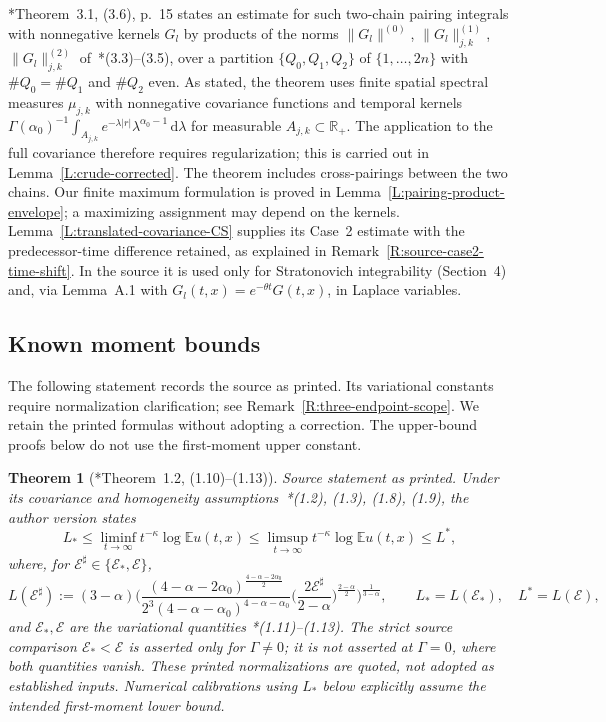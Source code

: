 \documentclass[12pt,oneside,openany]{book}
\numberwithin{equation}{section}
\newtheorem{theorem}{Theorem}[section]
\theoremstyle{nogostyle}
\theoremstyle{definition}
\newcommand{\R}{\mathbb{R}}
\newcommand{\E}{\mathbb{E}}
\newcommand{\ud}{\,\mathrm{d}}
\newcommand{\cE}{\mathcal{E}}
\begin{document}
\cite{chen:author2026:time-dependency}*{Theorem~3.1, (3.6), p.~15} states an
estimate for such two-chain pairing integrals with nonnegative kernels $G_l$ by
products of the norms $\|G_l\|^{(0)}$, $\|G_l\|^{(1)}_{j,k}$,
$\|G_l\|^{(2)}_{j,k}$ of~\cite{chen:author2026:time-dependency}*{(3.3)--(3.5)},
over a partition $\{Q_0,Q_1,Q_2\}$ of $\{1,\dots,2n\}$ with $\#Q_0 = \#Q_1$ and
$\#Q_2$ even. As stated, the theorem uses finite spatial spectral measures
$\mu_{j,k}$ with nonnegative covariance functions and temporal kernels
$\Gamma(\alpha_0)^{-1}\int_{A_{j,k}}e^{-\lambda|r|}
\lambda^{\alpha_0-1}\ud\lambda$ for measurable $A_{j,k} \subset \R_+$. The
application to the full covariance therefore requires regularization; this is
carried out in Lemma~\ref{L:crude-corrected}. The theorem includes
cross-pairings between the two chains. Our finite maximum formulation is proved
in Lemma~\ref{L:pairing-product-envelope}; a maximizing assignment may depend on
the kernels. Lemma~\ref{L:translated-covariance-CS} supplies its Case~2 estimate
with the predecessor-time difference retained, as explained in
Remark~\ref{R:source-case2-time-shift}. In the source it is used only for
Stratonovich integrability (Section~4) and, via Lemma~A.1 with $G_l(t,x) =
e^{-\theta t}G(t,x)$, in Laplace variables.

\subsection{Known moment bounds}

The following statement records the source as printed. Its variational constants
require normalization clarification; see Remark~\ref{R:three-endpoint-scope}. We
retain the printed formulas without adopting a correction. The upper-bound
proofs below do not use the first-moment upper constant.

\begin{theorem}[\cite{chen:author2026:time-dependency}*{Theorem~1.2, (1.10)--(1.13)}]\label{T:first}
  \emph{Source statement as printed.} Under its covariance and homogeneity
  assumptions~\cite{chen:author2026:time-dependency}*{(1.2), (1.3), (1.8), (1.9)},
  the author version states
  \[
    L_*\le\liminf_{t\to\infty}t^{-\kappa}\log\E u(t,x)
    \le\limsup_{t\to\infty}t^{-\kappa}\log\E u(t,x)\le L^*,
  \]
  where, for $\cE^\sharp \in \{\cE_*,\cE\}$,
  \[
    L(\cE^\sharp):=(3-\alpha)\bigg(
    \frac{(4-\alpha-2\alpha_0)^{\frac{4-\alpha-2\alpha_0}{2}}}
    {2^3(4-\alpha-\alpha_0)^{4-\alpha-\alpha_0}}
    \Big(\frac{2\cE^\sharp}{2-\alpha}\Big)^{\frac{2-\alpha}{2}}
    \bigg)^{\frac1{3-\alpha}},
    \qquad L_*=L(\cE_*),\quad L^*=L(\cE),
  \]
  and $\cE_*,\cE$ are the variational quantities
  \cite{chen:author2026:time-dependency}*{(1.11)--(1.13)}. The strict source
  comparison $\cE_* < \cE$ is asserted only for $\Gamma \ne 0$; it is not
  asserted at $\Gamma = 0$, where both quantities vanish. These printed
  normalizations are quoted, not adopted as established inputs. Numerical
  calibrations using $L_*$ below explicitly assume the intended first-moment
  lower bound.
\end{theorem}
\end{document}
